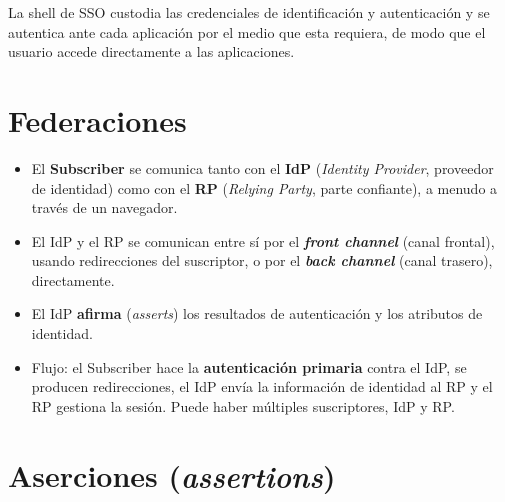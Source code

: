 \documentclass[11pt,a4paper]{report}
\begin{document}
\begin{center}
\end{center}
 
La shell de SSO custodia las credenciales de identificación y autenticación y se autentica ante cada aplicación por el medio que esta requiera, de modo que el usuario accede directamente a las aplicaciones.
 
\section{Federaciones}
 
\begin{itemize}
  \item El \textbf{Subscriber} se comunica tanto con el \textbf{IdP} (\emph{Identity Provider}, proveedor de identidad) como con el \textbf{RP} (\emph{Relying Party}, parte confiante), a menudo a través de un navegador.
  \item El IdP y el RP se comunican entre sí por el \textbf{\emph{front channel}} (canal frontal), usando redirecciones del suscriptor, o por el \textbf{\emph{back channel}} (canal trasero), directamente.
  \item El IdP \textbf{afirma} (\emph{asserts}) los resultados de autenticación y los atributos de identidad.
  \item Flujo: el Subscriber hace la \textbf{autenticación primaria} contra el IdP, se producen redirecciones, el IdP envía la información de identidad al RP y el RP gestiona la sesión. Puede haber múltiples suscriptores, IdP y RP.
\end{itemize}
 
\section{Aserciones (\emph{assertions})}
 
\end{document}
